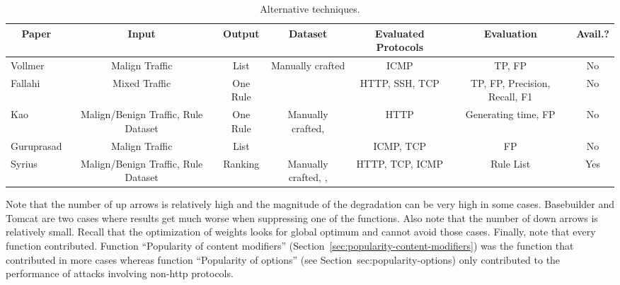 \documentclass[conference]{IEEEtran}
\begin{document}
\begin{table}[t!]
  \footnotesize
  \setlength{\tabcolsep}{3pt}
  \renewcommand{\arraystretch}{-0.01}
  \caption{\label{table:comparison}Alternative techniques.}
  \vspace{-2ex}
  \centering
    \begin{tabular}{lcccccc}
    \toprule
    \multicolumn{1}{c}{Paper} &
    \multicolumn{1}{c}{Input} &
    \multicolumn{1}{c}{Output} &    
    \multicolumn{1}{c}{Dataset} &
    \multicolumn{1}{c}{Evaluated Protocols} &
    \multicolumn{1}{c}{Evaluation} &
    \multicolumn{1}{c}{Avail.?} \\
    \midrule
    Vollmer\cite{vollmer-etal-cics2011} & Malign Traffic & List  & Manually crafted & ICMP & TP, FP & No\\
    Fallahi\cite{fallahi} & Mixed Traffic & One Rule  & \cite{iscx} & HTTP, SSH, TCP & TP, FP, Precision, Recall, F1 & No\\    
    Kao\cite{Kao2015AutomaticNR} & Malign/Benign Traffic, Rule Dataset &
    One Rule & Manually crafted, \cite{emerging-threats-open} & HTTP & Generating time, FP & No \\
    Guruprasad\cite{guruprasad}& Malign Traffic & List  & \cite{iscx} \cite{darpa1999} &
    ICMP, TCP & FP & No\\
    Syrius & Malign/Benign Traffic, Rule Dataset & Ranking & Manually crafted, \cite{emerging-threats-open}, \cite{iscx} & HTTP, TCP, ICMP & Rule List & Yes \\
    \bottomrule
    \end{tabular}
    \vspace{-3ex}
\end{table}

Note that the number of up arrows is relatively high and the magnitude
of the degradation can be very high in some cases. Basebuilder and
Tomcat are two cases where results get much worse when suppressing one
of the functions. Also note that the number of down arrows is
relatively small. Recall that the optimization of weights looks for
global optimum and cannot avoid those cases. Finally, note that every
function contributed. Function ``Popularity of content modifiers''
(Section~\ref{sec:popularity-content-modifiers}) was the function that
contributed in more cases whereas function ``Popularity of options''
(see Section~{sec:popularity-options}) only contributed to the
performance of attacks involving non-http protocols.


\end{document}
